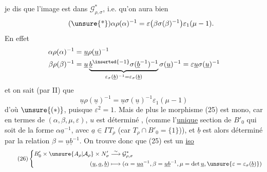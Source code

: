 je dis que l'image est dans $\mathcal G^*_{\rho,\sigma}$, i.e.
qu'on aura bien
\[
\tag{\unsure{*}}
\alpha\rho(\alpha)^{-1}
=\varepsilon\bigl(\beta\sigma(\beta)^{-1}\bigr)\varepsilon_1(\mu-1).
\]
En effet
\[
\begin{aligned}
\alpha\rho(\alpha)^{-1}&=\underline u\rho(\underline u)^{-1}\\
\beta\rho(\beta)^{-1}
&=\underline u\underbrace{
\underline b^{\inserted{-1}}\sigma(\underline b^{-1})^{-1}
}_{\varepsilon_\sigma(\underline b)^{-1}=\varepsilon_\sigma(\underline b)}
\sigma(\underline u)^{-1}
=\varepsilon\underline u\sigma(\underline u)^{-1}
\end{aligned}
\]
et on sait (par II) que
\[
\underline u\rho(\underline u)^{-1}
=\underline u\sigma(\underline u)^{-1}\varepsilon_1(\mu-1)
\]
d'où $\unsure{(*)}$, puisque $\varepsilon^2=1$. Mais de
plus le morphisme (25) est mono, 
car en termes de $(\alpha,\beta,\mu,\varepsilon)$, $u$ est déterminé
,
(comme l'\uline{unique} section de $B'_0$ qui
soit de la forme $\alpha\underline a^{-1}$, avec $\underline a\in\Gamma T_\rho$
(car $T_\rho\cap B'_0=\{1\}$)), et $\underline b$ est alors déterminé
par la relation $\beta=\underline u\underline b^{-1}$. On trouve
donc que (25) est un \uline{iso}
\[
\tag{26}
\left\{\begin{aligned}
B'_0\times\unsure{A_\rho|\mathcal A_\rho}\times N'_\sigma
&\overset{\sim}{\longrightarrow}\mathcal G^*_{\rho,\sigma}\\
(\underline u,\underline a,\underline b)
&\longmapsto
(\alpha=\underline u\underline a^{-1},\beta=\underline u\underline b^{-1},
\mu=\det\underline u,\unsure{\varepsilon=\varepsilon_\sigma(\underline b)})
\end{aligned}\right.
\]


